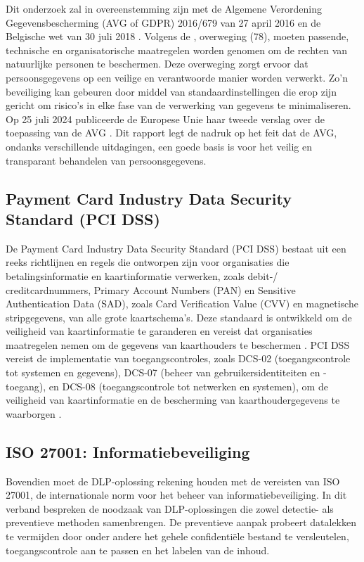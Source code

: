 Dit onderzoek zal in overeenstemming zijn met de Algemene Verordening Gegevensbescherming (AVG of GDPR) 2016/679 van 27 april 2016 \autocite{eu_avg2016} en de Belgische wet van 30 juli 2018 \autocite{BelgischeOverheid2018}.
Volgens de \textcite{eu_avg2016}, overweging (78), moeten passende, technische en organisatorische maatregelen worden genomen om de rechten van natuurlijke personen te beschermen. 
Deze overweging zorgt ervoor dat persoonsgegevens op een veilige en verantwoorde manier worden verwerkt. 
Zo'n beveiliging kan gebeuren door middel van standaardinstellingen die erop zijn gericht om risico's in elke fase van de verwerking van gegevens te minimaliseren.
Op 25 juli 2024 publiceerde de Europese Unie haar tweede verslag over de toepassing van de AVG \autocite{eu_avg2024}. 
Dit rapport legt de nadruk op het feit dat de AVG, ondanks verschillende uitdagingen, een goede basis is voor het veilig en transparant behandelen van persoonsgegevens. 


\subsection{Payment Card Industry Data Security Standard (PCI DSS)}%

De Payment Card Industry Data Security Stand\-ard (PCI DSS) bestaat uit een reeks richtlijnen en regels die ontworpen zijn voor organisaties die betalingsinformatie en kaartinformatie verwerken, 
zoals debit-/ creditcardnummers, Primary Account Numbers (PAN) en Sensitive Authentication Data (SAD), zoals Card Verification Value (CVV) en magnetische stripgegevens, van alle grote kaartsche\-ma's. 
Deze standaard is ontwikkeld om de veiligheid van kaartinformatie te garanderen en vereist dat organisaties maatregelen nemen om de gegevens van kaarthouders te beschermen \autocite{Elluri2018}. 
PCI DSS vereist de implementatie van toegangscontroles, zoals DCS-02 (toegangscontrole tot systemen en gegevens), DCS-07 (beheer van gebruikersidentiteiten en -toegang), 
en DCS-08 (toegangscontrole tot netwerken en systemen), om de veiligheid van kaartinformatie en de bescherming van kaarthoudergegevens te waarborgen \autocite{Elluri2018}.

\subsection{ISO 27001: Informatiebeveiliging}%

Bovendien moet de DLP-oplossing rekening houden met de vereisten van ISO 27001, de internationale norm voor het beheer van informatiebeveiliging. 
In dit verband bespreken \textcite{Alsanabani2020} de noodzaak van DLP-oploss\-ingen die zowel detectie- als preventieve methoden samenbrengen. 
De preventieve aanpak probeert datalekken te vermijden door onder andere het gehele confidentiële bestand te versleutelen, toegangscontrole aan te passen en het labelen van de inhoud.

